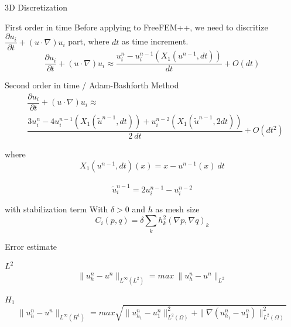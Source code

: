 \documentclass{beamer}
\begin{document}
\begin{frame}{3D Discretization}
\begin{block}{First order in time}
	Before applying to FreeFEM++, we need to discritize $ \dfrac{\partial u_{i}}{\partial t} + (u \cdot \nabla)u_{i} $ part, where $ dt $ as time increment.
	\[ \dfrac{\partial u_{i}}{\partial t} + (u \cdot \nabla)u_{i} \approx \dfrac{u_{i}^{n}-u_{i}^{n-1}(X_{1}(u^{n-1},dt))}{dt} + O(dt) \]
\end{block}
\begin{block}{Second order in time / Adam-Bashforth Method}
	\begin{eqnarray}\nonumber
		&\dfrac{\partial u_{i}}{\partial t} + (u \cdot \nabla)u_{i} \approx\\ \nonumber &\dfrac{3u_{i}^{n}-4u_{i}^{n-1}(X_{1}(\tilde{u}^{n-1},dt))+u_{i}^{n-2}(X_{1}(\tilde{u}^{n-1},2dt))}{2\ dt} + O(dt^2)
	\end{eqnarray}
\end{block}
\end{frame}

\begin{frame}
\begin{block}{where}
	\[ X_{1}(u^{n-1},dt)(x) = x - u^{n-1}(x)\ dt\]\\
	\[\tilde{u}^{n-1}_{i} = 2u_{i}^{n-1}-u_{i}^{n-2}\]
\end{block}
\begin{block}{with stabilization term}
	With $ \delta>0 $ and $ h $ as mesh size
	\[ C_{i}(p,q) = \delta \sum_{k} h_{k}^{2}(\nabla p, \nabla q)_{k} \]
\end{block}
\end{frame}

\begin{frame}{Error estimate}
\begin{block}{$ L^{2} $}
	\[\| u_{h}^{n}-u^{n} \|_{L^\infty(L^2)} =  max \ \| u_{h}^{n}-u^{n} \|_{L^{2}}\]
\end{block}
\begin{block}{$ H_{1} $}
	\[\| u_{h}^{n}-u^{n} \|_{L^\infty(H^{1})} = max \sqrt{\| u_{h_{1}}^{n}-u_{1}^{n} \|_{L^2(\Omega)}^{2} + \| \nabla (u_{h_{1}}^{n}-u_{1}^{n}) \|_{L^2(\Omega)}^{2}}\]
\end{block}
\end{frame}
\end{document}
